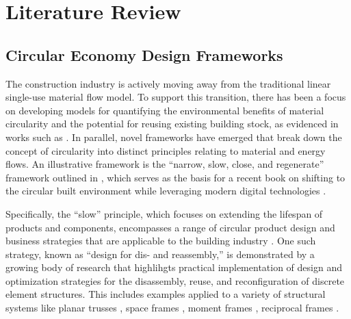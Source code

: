 \section{Literature Review} \label{sec:2_lit}

\subsection{Circular Economy Design Frameworks} \label{sec:2a_circular}
    The construction industry is actively moving away from the traditional linear single-use material flow model. To support this transition, there has been a focus on developing models for quantifying the environmental benefits of material circularity and the potential for reusing existing building stock, as evidenced in works such as \cite{cottafava_circularity_2021, eberhardt_circular_2021}. In parallel, novel frameworks have emerged that break down the concept of circularity into distinct principles relating to material and energy flows. An illustrative framework is the ``narrow, slow, close, and regenerate'' framework outlined in \cite{konietzko_circular_2020, cetin_circular_2021}, which serves as the basis for a recent book on shifting to the circular built environment while leveraging modern digital technologies \citep{de_wolf_circular_2023}.
    
    Specifically, the ``slow'' principle, which focuses on extending the lifespan of products and components, encompasses a range of circular product design and business strategies that are applicable to the building industry \citep{bocken_product_2016}. One such strategy, known as ``design for dis- and reassembly,'' is demonstrated by a growing body of research that highlihgts practical implementation of design and optimization strategies for the disassembly, reuse, and reconfiguration of discrete element structures. This includes examples applied to a variety of structural systems like planar trusses \citep{brutting_design_2019, naboni_design_2021}, space frames \citep{brutting_design_2021, bruun_structural_2022}, moment frames \citep{brutting_optimum_2020}, reciprocal frames \citep{glath_thinking_2022, zahiri_sequential_2023}.

